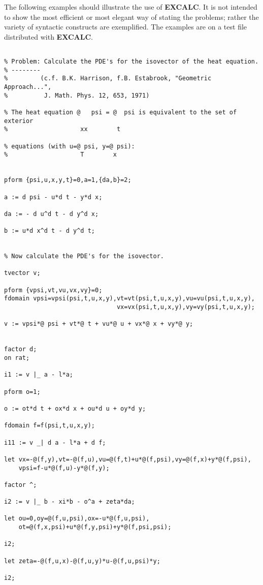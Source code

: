 The following examples should illustrate the use of {\bf EXCALC}. It is not
intended to show the most efficient or most elegant way of stating the
problems; rather the variety of syntactic constructs are exemplified.
The examples are on a test file distributed with {\bf EXCALC}.
{\small
\begin{verbatim}

% Problem: Calculate the PDE's for the isovector of the heat equation.
% --------
%         (c.f. B.K. Harrison, f.B. Estabrook, "Geometric Approach...",
%          J. Math. Phys. 12, 653, 1971)

% The heat equation @   psi = @  psi is equivalent to the set of exterior
%                    xx        t

% equations (with u=@ psi, y=@ psi):
%                    T        x


pform {psi,u,x,y,t}=0,a=1,{da,b}=2;

a := d psi - u*d t - y*d x;

da := - d u^d t - d y^d x;

b := u*d x^d t - d y^d t;


% Now calculate the PDE's for the isovector.

tvector v;

pform {vpsi,vt,vu,vx,vy}=0;
fdomain vpsi=vpsi(psi,t,u,x,y),vt=vt(psi,t,u,x,y),vu=vu(psi,t,u,x,y),
                               vx=vx(psi,t,u,x,y),vy=vy(psi,t,u,x,y);

v := vpsi*@ psi + vt*@ t + vu*@ u + vx*@ x + vy*@ y;


factor d;
on rat;

i1 := v |_ a - l*a;

pform o=1;

o := ot*d t + ox*d x + ou*d u + oy*d y;

fdomain f=f(psi,t,u,x,y);

i11 := v _| d a - l*a + d f;

let vx=-@(f,y),vt=-@(f,u),vu=@(f,t)+u*@(f,psi),vy=@(f,x)+y*@(f,psi),
    vpsi=f-u*@(f,u)-y*@(f,y);

factor ^;

i2 := v |_ b - xi*b - o^a + zeta*da;

let ou=0,oy=@(f,u,psi),ox=-u*@(f,u,psi),
    ot=@(f,x,psi)+u*@(f,y,psi)+y*@(f,psi,psi);

i2;

let zeta=-@(f,u,x)-@(f,u,y)*u-@(f,u,psi)*y;

i2;


\end{verbatim}}

